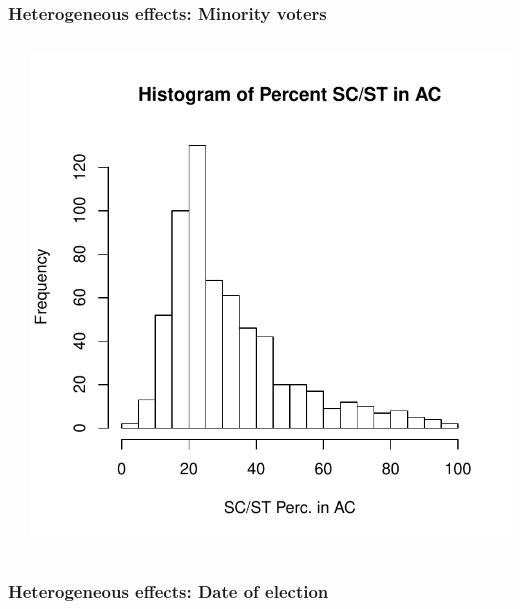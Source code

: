 \documentclass{beamer}
\begin{document}
\begin{frame}
\frametitle{Heterogeneous effects: Minority voters}
\begin{columns}[T] %
\begin{column}{.48\textwidth}
\end{column}%
\hfill%
\begin{column}{.48\textwidth}
\vspace{-10pt}
\includegraphics[scale=.45]{../Figures/histscstpc.pdf}
\end{column}%
\end{columns}
\end{frame}


\begin{frame}
\frametitle{Heterogeneous effects: Date of election}
\end{frame}
\end{document}
